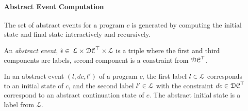  \paragraph{Abstract Event Computation} 
 The set of abstract events for a program $c$ is generated by computing the initial state and final state interactively and recursively.
 \begin{defn}
 \label{def:adaptfun-abs_event}
 An \emph{abstract event},
 $\hat{\mathtt{\epsilon}{}} \in $
 $\mathcal{L} \times \mathcal{DC}^{\top} \times \mathcal{L}$
 is a 
 triple where the first and third components are labels,
 second component is a constraint from $\mathcal{DC}^{\top}$.
 \end{defn}
 In an abstract event $(l, dc, l')$ of a program $c$, 
 the first label $l \in \mathcal{L}$ corresponds to an initial state of $c$, and 
 the second label $l' \in \mathcal{L}$ with the constraint $dc \in \mathcal{DC}^{\top}$ correspond to an abstract continuation state of $c$.
 The abstract initial state is a label from $\mathcal{L}$.

